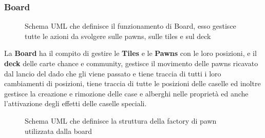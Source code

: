 \subsubsection{Board}
\begin{figure}[H]
    \centering
    \caption{Schema UML che definisce il funzionamento di Board, esso gestisce tutte le azioni da svolgere sulle pawns, sulle tiles e sul deck}
	\label{img:Board}
\end{figure}
La \textbf{Board} ha il compito di gestire le \textbf{Tiles} e le \textbf{Pawns} con le loro posizioni, e il \textbf{deck} delle carte chance e community, 
gestisce il movimento delle pawns ricavato dal lancio del dado che gli viene passato e tiene traccia di tutti i loro cambiamenti di posizioni,
tiene traccia di tutte le posizioni delle caselle ed inoltre gestisce la creazione e rimozione delle case e alberghi nelle proprietà 
ed anche l'attivazione degli effetti delle caselle speciali.\newline
\begin{figure}[H]
    \centering
    \caption{Schema UML che definisce la struttura della factory di pawn utilizzata dalla board}
	\label{img:Pawns}
\end{figure}
